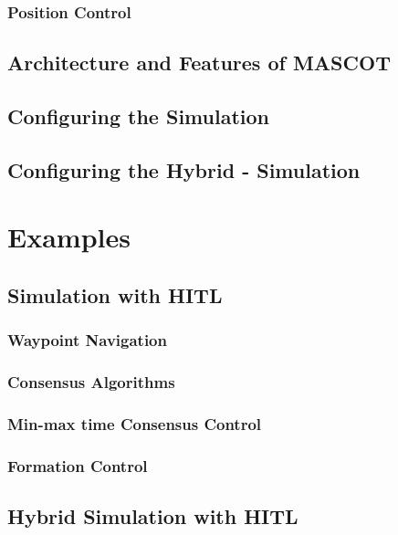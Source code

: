 \documentclass[letterpaper, 10 pt, conference]{ieeeconf}
\begin{document}
\subsubsection{Position Control}


\subsection{Architecture and Features of MASCOT}

\subsection{Configuring the Simulation}

\subsection{Configuring the Hybrid - Simulation}



\section{Examples}\label{sec: Use Cases}



\subsection{Simulation with HITL}

\subsubsection{Waypoint Navigation}
\subsubsection{Consensus Algorithms}
\subsubsection{Min-max time Consensus Control}
\subsubsection{Formation Control}

\subsection{Hybrid Simulation with HITL}
\end{document}
